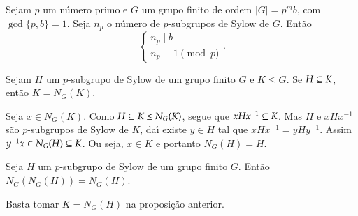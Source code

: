 \begin{teorema}
	Sejam $p$ um n\'umero primo e $G$ um grupo finito de ordem $|G| = p^mb$, com $\gcd\{p, b\} = 1$. Seja $n_p$ o n\'umero de $p$-subgrupos de Sylow de $G$. Ent\~ao
	\[
		\begin{cases}
			n_p \mid b\\
			n_p \equiv 1 \pmod p
		\end{cases}.
	\]
\end{teorema}

\begin{proposicao}
	Sejam $H$ um $p$-subgrupo de Sylow de um grupo finito $G$ e $K \le G$. Se $H \subseteq K$, ent\~ao $K = N_G(K)$.
\end{proposicao}
\begin{prova}
	Seja $x \in N_G(K)$. Como $H \subseteq K \unlhd N_G(K)$, segue que $xHx^{-1} \subseteq K$. Mas $H$ e $xHx^{-1}$ s\~ao $p$-subgrupos de Sylow de $K$, da{\'\i} existe $y \in H$ tal que $xHx^{-1} = yHy^{-1}$. Assim $y^{-1}x \in N_G(H) \subseteq K$. Ou seja, $x \in K$ e portanto $N_G(H) = H$.
\end{prova}

\begin{corolario}
	Seja $H$ um $p$-subgrupo de Sylow de um grupo finito $G$. Ent\~ao $N_G(N_G(H)) = N_G(H)$.
\end{corolario}
\begin{prova}
	Basta tomar $K = N_G(H)$ na proposi\c{c}\~ao anterior.
\end{prova}




